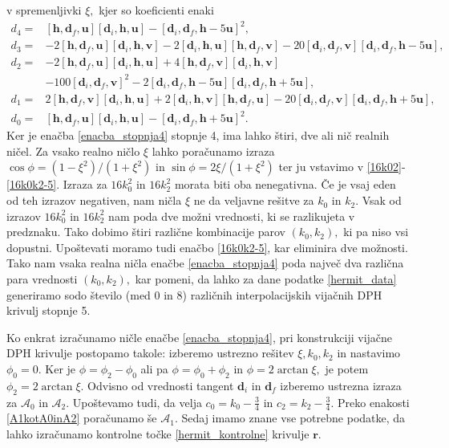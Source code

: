 \documentclass[12pt,a4paper,twoside]{article}
\theoremstyle{definition} %
\theoremstyle{plain} %
\theoremstyle{primerstyle}
\numberwithin{equation}{section}  %
\newcommand{\dV}{\mathbf{d}}
\newcommand{\hV}{\mathbf{h}}
\newcommand{\rV}{\mathbf{r}}
\newcommand{\uV}{\mathbf{u}}
\newcommand{\vV}{\mathbf{v}}
\newcommand{\AQ}{\mathcal{A}}
\begin{document}
v spremenljivki $\xi,$ kjer so koeficienti enaki
\begin{align}
	\label{d_koeficienti}
	d_4=&[\hV,\dV_f,\uV][\dV_i,\hV,\uV]-[\dV_i,\dV_f,\hV-5\uV]^2,\nonumber\\
	d_3=&-2[\hV,\dV_f,\uV][\dV_i,\hV,\vV]-2[\dV_i,\hV,\uV][\hV,\dV_f,\vV]-20[\dV_i,\dV_f,\vV][\dV_i,\dV_f,\hV-5\uV],\nonumber\\
	d_2=&-2[\hV,\dV_f,\uV][\dV_i,\hV,\uV]+4[\hV,\dV_f,\vV][\dV_i,\hV,\vV]\nonumber\\
	&-100[\dV_i,\dV_f,\vV]^2-2[\dV_i,\dV_f,\hV-5\uV][\dV_i,\dV_f,\hV+5\uV],\\
	d_1=&2[\hV,\dV_f,\vV][\dV_i,\hV,\uV]+2[\dV_i,\hV,\vV][\hV,\dV_f,\uV]-20[\dV_i,\dV_f,\vV][\dV_i,\dV_f,\hV+5\uV],\nonumber\\
	d_0=&[\hV,\dV_f,\uV][\dV_i,\hV,\uV]-[\dV_i,\dV_f,\hV+5\uV]^2.\nonumber
\end{align}
Ker je enačba \eqref{enacba_stopnja4} stopnje 4, ima lahko štiri, dve ali nič realnih ničel. Za vsako realno ničlo $\xi$ lahko poračunamo izraza $\cos\phi=(1-\xi^2)/(1+\xi^2)$ in $\sin\phi=2\xi/(1+\xi^2)$ ter ju vstavimo v \eqref{16k02}-\eqref{16k0k2-5}. Izraza za $16k_0^2$ in $16k_2^2$ morata biti oba nenegativna. Če je vsaj eden od teh izrazov negativen, nam ničla $\xi$ ne da veljavne rešitve za $k_0$ in $k_2$. Vsak od izrazov $16k_0^2$ in $16k_2^2$ nam poda dve možni vrednosti, ki se razlikujeta v predznaku. Tako dobimo štiri različne kombinacije parov $(k_0,k_2),$ ki pa niso vsi dopustni. Upoštevati moramo tudi enačbo \eqref{16k0k2-5}, kar eliminira dve možnosti. Tako nam vsaka realna ničla enačbe \eqref{enacba_stopnja4} poda največ dva različna para vrednosti $(k_0,k_2),$ kar pomeni, da lahko za dane podatke \eqref{hermit_data} generiramo sodo število (med 0 in 8) različnih interpolacijskih vijačnih DPH krivulj stopnje 5. 

Ko enkrat izračunamo ničle enačbe \eqref{enacba_stopnja4}, pri konstrukciji vijačne DPH krivulje postopamo takole: izberemo ustrezno rešitev $\xi,k_0,k_2$ in nastavimo $\phi_0=0.$ Ker je $\phi=\phi_2-\phi_0$ ali pa $\phi=\phi_0+\phi_2$ in $\phi=2\arctan\xi,$ je potem $\phi_2=2\arctan\xi.$ Odvisno od vrednosti tangent $\dV_i$ in $\dV_f$ izberemo ustrezna izraza za $\AQ_0$ in $\AQ_2.$ Upoštevamo tudi, da velja $c_0=k_0-\frac{3}{4}$ in $c_2=k_2-\frac{3}{4}.$ Preko enakosti \eqref{A1kotA0inA2} poračunamo še $\AQ_1.$ Sedaj imamo znane vse potrebne podatke, da lahko izračunamo kontrolne točke \eqref{hermit_kontrolne} krivulje $\rV$.
\end{document}
